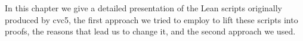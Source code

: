 In this chapter we give a detailed presentation of the Lean scripts originally produced by cvc5, the first approach we tried to employ to lift these scripts into proofs, the reasons that lead us to change it, and the second approach we used.
